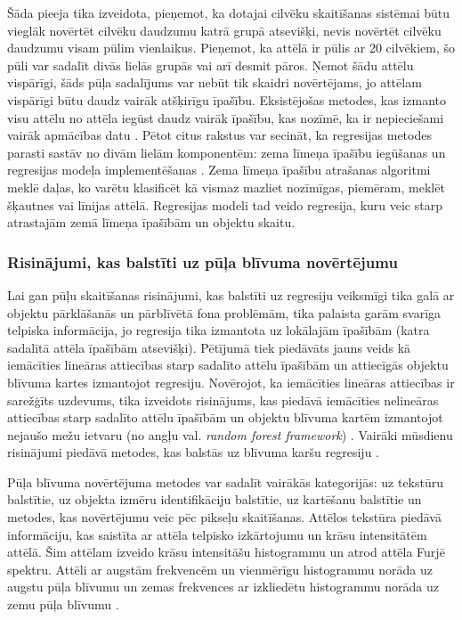 Šāda pieeja tika izveidota, pieņemot, ka dotajai cilvēku skaitīšanas sistēmai būtu vieglāk novērtēt cilvēku daudzumu katrā grupā atsevišķi, nevis novērtēt cilvēku daudzumu visam pūlim vienlaikus. Pieņemot, ka attēlā ir pūlis ar 20 cilvēkiem, šo pūli var sadalīt divās lielās grupās vai arī desmit pāros. Ņemot šādu attēlu vispārīgi, šāds pūļa sadalījums var nebūt tik skaidri novērtējams, jo attēlam vispārīgi būtu daudz vairāk atšķirīgu īpašību. Eksistējošas metodes, kas izmanto visu attēlu no attēla iegūst daudz vairāk īpašību, kas nozīmē, ka ir nepieciešami vairāk apmācības datu \cite{chan2008privacy}. Pētot citus rakstus var secināt, ka regresijas metodes parasti sastāv no divām lielām komponentēm: zema līmeņa īpašību iegūšanas un regresijas modeļa implementēšanas \cite{xiong2017spatiotemporal}. Zema līmeņa īpašību atrašanas algoritmi meklē daļas, ko varētu klasificēt kā vismaz mazliet nozīmīgas, piemēram, meklēt šķautnes vai līnijas attēlā. Regresijas modeli tad veido regresija, kuru veic starp atrastajām zemā līmeņa īpašībām un objektu skaitu.
\subsubsection{Risinājumi, kas balstīti uz pūļa blīvuma novērtējumu}
Lai gan pūļu skaitīšanas risinājumi, kas balstīti uz regresiju veiksmīgi tika galā ar objektu pārklāšanās un pārblīvētā fona problēmām, tika palaista garām svarīga telpiska informācija, jo regresija tika izmantota uz lokālajām īpašībām (katra sadalītā attēla īpašībām atsevišķi). Pētījumā \cite{lempitsky2010learning} tiek piedāvāts jauns veids kā iemācīties lineāras attiecības starp sadalīto attēlu īpašībām un attiecīgās objektu blīvuma kartes izmantojot regresiju. Novērojot, ka iemācīties lineāras attiecības ir sarežģīts uzdevums, tika izveidots risinājums, kas piedāvā iemācīties nelineāras attiecības starp sadalīto attēlu īpašībām un objektu blīvuma kartēm izmantojot nejaušo mežu ietvaru (no angļu val. \textit{random forest framework}) \cite{pham2015count}. Vairāki mūsdienu risinājumi piedāvā metodes, kas balstās uz blīvuma karšu regresiju \cite{wang2016fast,xia2016block}. 

Pūļa blīvuma novērtējuma metodes var sadalīt vairākās kategorijās: uz tekstūru balstītie, uz objekta izmēru identifikāciju balstītie, uz kartēšanu balstītie un metodes, kas novērtējumu veic pēc pikseļu skaitīšanas. Attēlos tekstūra piedāvā informāciju, kas saistīta ar attēla telpisko izkārtojumu un krāsu intensitātēm attēlā. Šim attēlam izveido krāsu intensitāšu histogrammu un atrod attēla Furjē spektru. Attēli ar augstām frekvencēm un vienmērīgu histogrammu norāda uz augstu pūļa blīvumu un zemas frekvences ar izkliedētu histogrammu norāda uz zemu pūļa blīvumu \cite{marana1998automatic}. 

